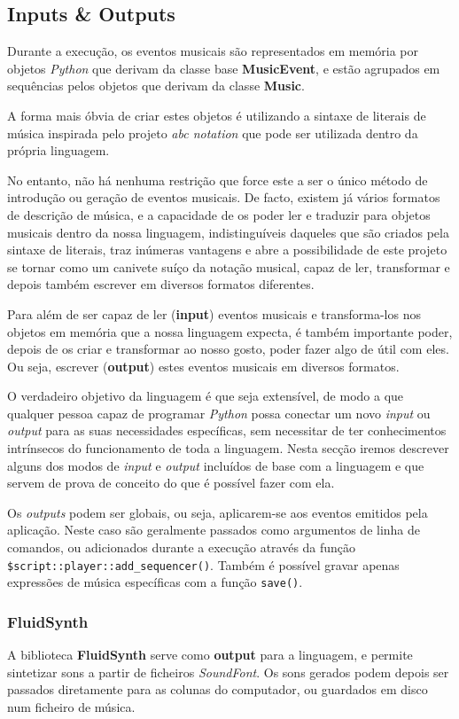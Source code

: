 \subsection{Inputs \& Outputs}
Durante a execução, os eventos musicais são representados em memória por objetos \textit{Python} que derivam da classe base \textbf{MusicEvent}, e estão agrupados em sequências pelos objetos que derivam da classe \textbf{Music}.

A forma mais óbvia de criar estes objetos é utilizando a sintaxe de literais de música inspirada pelo projeto \textit{abc notation} que pode ser utilizada dentro da própria linguagem.

No entanto, não há nenhuma restrição que force este a ser o único método de introdução ou geração de eventos musicais. De facto, existem já vários formatos de descrição de música, e a capacidade de os poder ler e traduzir para objetos musicais dentro da nossa linguagem, indistinguíveis daqueles que são criados pela sintaxe de literais, traz inúmeras vantagens e abre a possibilidade de este projeto se tornar como um canivete suíço da notação musical, capaz de ler, transformar e depois também escrever em diversos formatos diferentes.

Para além de ser capaz de ler (\textbf{input}) eventos musicais e transforma-los nos objetos em memória que a nossa linguagem expecta, é também importante poder, depois de os criar e transformar ao nosso gosto, poder fazer algo de útil com eles. Ou seja, escrever (\textbf{output}) estes eventos musicais em diversos formatos.

O verdadeiro objetivo da linguagem é que seja extensível, de modo a que qualquer pessoa capaz de programar \textit{Python} possa conectar um novo \textit{input} ou \textit{output} para as suas necessidades específicas, sem necessitar de ter conhecimentos intrínsecos do funcionamento de toda a linguagem. Nesta secção iremos descrever alguns dos modos de \textit{input} e \textit{output} incluídos de base com a linguagem e que servem de prova de conceito do que é possível fazer com ela.

Os \textit{outputs} podem ser globais, ou seja, aplicarem-se aos eventos emitidos pela aplicação. Neste caso são geralmente passados como argumentos de linha de comandos, ou adicionados durante a execução através da função \texttt{\$script::player::add\_sequencer()}. Também é possível gravar apenas expressões de música específicas com a função \texttt{save()}.
\subsubsection{FluidSynth}
A biblioteca \textbf{FluidSynth} serve como \textbf{output} para a linguagem, e permite sintetizar sons a partir de ficheiros \textit{SoundFont}. Os sons gerados podem depois ser passados diretamente para as colunas do computador, ou guardados em disco num ficheiro de música.

